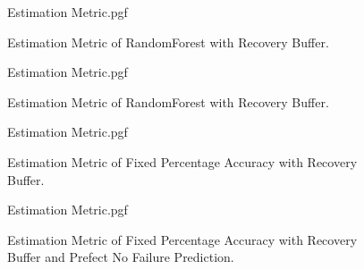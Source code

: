 \documentclass[letterpaper, 10 pt, conference]{ieeeconf}  %
\begin{document}
	\begin{figure}[!htb]
		\begin{center}
			{Estimation Metric.pgf}
		\end{center}
		\caption[Estimation Metric of RandomForest with Recovery Buffer]{Estimation Metric of RandomForest with Recovery Buffer.}
		\label{fig:Summary Estimation Accuracy EKF-ignore RandomForest with Recovery Buffer}
	\end{figure}
	
	\begin{figure}[!htb]
		\begin{center}
			{Estimation Metric.pgf}
		\end{center}
		\caption[Estimation Metric of RandomForest with Recovery Buffer]{Estimation Metric of RandomForest with Recovery Buffer.}
		\label{fig:Estimation Accuracy EKF-ignore RandomForest with Recovery Buffer}
	\end{figure}
	
	\begin{figure}[!htb]
		\begin{center}
			{Estimation Metric.pgf}
		\end{center}
		\caption[Estimation Metric of $90.0\%$ Accuracy with Recovery Buffer]{Estimation Metric of Fixed Percentage Accuracy with Recovery Buffer.}
		\label{fig:Estimation Accuracy EKF-ignore RandomForest withoutt Buffer}
	\end{figure}
	
	\begin{figure}[!htb]
		\begin{center}
			{Estimation Metric.pgf}
		\end{center}
		\caption[Estimation Metric of $90.0\%$ Accuracy with Recovery Buffer and Prefect No Failure Prediction]{Estimation Metric of Fixed Percentage Accuracy with Recovery Buffer and Prefect No Failure Prediction.}
		\label{fig:Estimation Accuracy EKF-ignore 90 with Recovery Buffer and prefectNoFailurePrediction}
	\end{figure}
	
	
	
	
\end{document}
